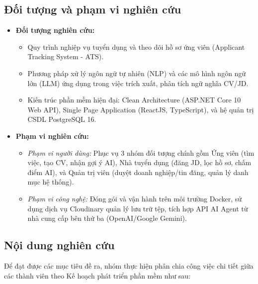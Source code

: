 \subsection{Đối tượng và phạm vi nghiên cứu}
\begin{itemize}
    \item \textbf{Đối tượng nghiên cứu:}
    \begin{itemize}
        \item Quy trình nghiệp vụ tuyển dụng và theo dõi hồ sơ ứng viên (Applicant Tracking System - ATS).
        \item Phương pháp xử lý ngôn ngữ tự nhiên (NLP) và các mô hình ngôn ngữ lớn (LLM) ứng dụng trong việc trích xuất, phân tích ngữ nghĩa CV/JD.
        \item Kiến trúc phần mềm hiện đại: Clean Architecture (ASP.NET Core 10 Web API), Single Page Application (ReactJS, TypeScript), và hệ quản trị CSDL PostgreSQL 16.
    \end{itemize}
    \item \textbf{Phạm vi nghiên cứu:}
    \begin{itemize}
        \item \textit{Phạm vi người dùng:} Phục vụ 3 nhóm đối tượng chính gồm Ứng viên (tìm việc, tạo CV, nhận gợi ý AI), Nhà tuyển dụng (đăng JD, lọc hồ sơ, chấm điểm AI), và Quản trị viên (duyệt doanh nghiệp/tin đăng, quản lý danh mục hệ thống).
        \item \textit{Phạm vi công nghệ:} Đóng gói và vận hành trên môi trường Docker, sử dụng dịch vụ Cloudinary quản lý lưu trữ tệp, tích hợp API AI Agent từ nhà cung cấp bên thứ ba (OpenAI/Google Gemini).
    \end{itemize}
\end{itemize}

\subsection{Nội dung nghiên cứu}
Để đạt được các mục tiêu đề ra, nhóm thực hiện phân chia công việc chi tiết giữa các thành viên theo Kế hoạch phát triển phần mềm như sau:

